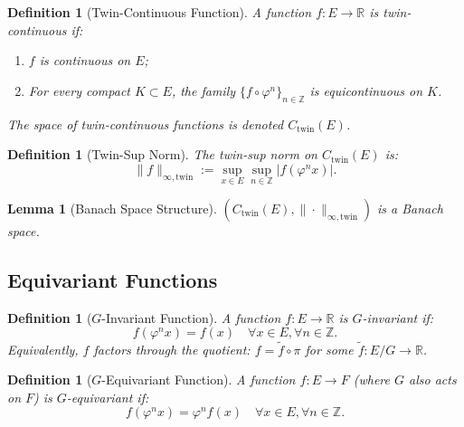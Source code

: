 \documentclass[11pt]{article}
\newtheorem{lemma}[theorem]{Lemma}
\newtheorem{definition}[theorem]{Definition}
\newcommand{\R}{\mathbb{R}}
\newcommand{\Z}{\mathbb{Z}}
\begin{document}
\begin{definition}[Twin-Continuous Function]\label{def:twin_continuous}
A function $f : E \to \R$ is twin-continuous if:
\begin{enumerate}
\item $f$ is continuous on $E$;
\item For every compact $K \subset E$, the family $\{f \circ \varphi^n\}_{n \in \Z}$ is equicontinuous on $K$.
\end{enumerate}
The space of twin-continuous functions is denoted $C_{\mathrm{twin}}(E)$.
\end{definition}

\begin{definition}[Twin-Sup Norm]\label{def:twin_norm}
The twin-sup norm on $C_{\mathrm{twin}}(E)$ is:
\begin{equation}\label{eq:twin_norm}
\|f\|_{\infty,\mathrm{twin}} := \sup_{x \in E} \sup_{n \in \Z} |f(\varphi^n x)|.
\end{equation}
\end{definition}

\begin{lemma}[Banach Space Structure]\label{lem:banach}
$(C_{\mathrm{twin}}(E), \|\cdot\|_{\infty,\mathrm{twin}})$ is a Banach space.
\end{lemma}

\subsection{Equivariant Functions}

\begin{definition}[$G$-Invariant Function]\label{def:invariant}
A function $f : E \to \R$ is $G$-invariant if:
\begin{equation}\label{eq:invariant}
f(\varphi^n x) = f(x) \quad \forall x \in E, \forall n \in \Z.
\end{equation}
Equivalently, $f$ factors through the quotient: $f = \tilde{f} \circ \pi$ for some $\tilde{f} : E/G \to \R$.
\end{definition}

\begin{definition}[$G$-Equivariant Function]\label{def:equivariant}
A function $f : E \to F$ (where $G$ also acts on $F$) is $G$-equivariant if:
\begin{equation}\label{eq:equivariant}
f(\varphi^n x) = \varphi^n f(x) \quad \forall x \in E, \forall n \in \Z.
\end{equation}
\end{definition}
\end{document}
